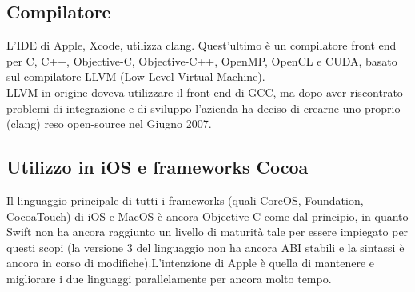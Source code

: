 \subsection{Compilatore}
L'IDE di Apple, Xcode, utilizza clang. Quest'ultimo è un compilatore front end per C, C++, Objective-C, Objective-C++, OpenMP, OpenCL e CUDA, basato sul compilatore LLVM (Low Level Virtual Machine).\\
LLVM in origine doveva utilizzare il front end di GCC, ma dopo aver riscontrato problemi di integrazione e di sviluppo l'azienda ha deciso di crearne uno proprio (clang) reso open-source nel Giugno 2007. 
\subsection{Utilizzo in iOS e frameworks Cocoa}
Il linguaggio principale di tutti i frameworks (quali CoreOS, Foundation, CocoaTouch) di iOS e MacOS è ancora Objective-C come dal principio, in quanto Swift non ha ancora raggiunto un livello di maturità tale per essere impiegato per questi scopi (la versione 3 del linguaggio non ha ancora ABI stabili e la sintassi è ancora in corso di modifiche).L'intenzione di Apple è quella di mantenere e migliorare i due linguaggi parallelamente per ancora molto tempo.